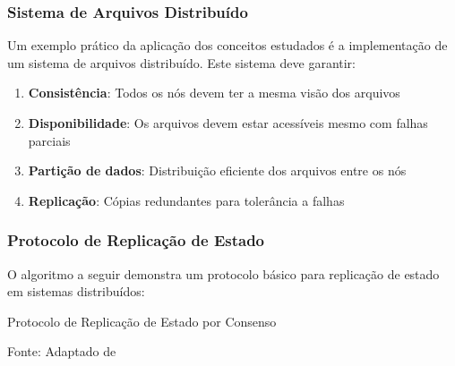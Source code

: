 \subsubsection{Sistema de Arquivos Distribuído}

Um exemplo prático da aplicação dos conceitos estudados é a implementação de um sistema de arquivos distribuído. Este sistema deve garantir:

\begin{enumerate}
    \item \textbf{Consistência}: Todos os nós devem ter a mesma visão dos arquivos
    \item \textbf{Disponibilidade}: Os arquivos devem estar acessíveis mesmo com falhas parciais
    \item \textbf{Partição de dados}: Distribuição eficiente dos arquivos entre os nós
    \item \textbf{Replicação}: Cópias redundantes para tolerância a falhas
\end{enumerate}

\subsubsection{Protocolo de Replicação de Estado}

O algoritmo a seguir demonstra um protocolo básico para replicação de estado em sistemas distribuídos:

\begin{algorithm}[H]
\SetAlgoLined
{}


\caption{Protocolo de Replicação de Estado por Consenso}
\label{alg:state_replication}
{\fontsize{10pt}{\baselineskip}\selectfont
Fonte: Adaptado de }
\end{algorithm}

